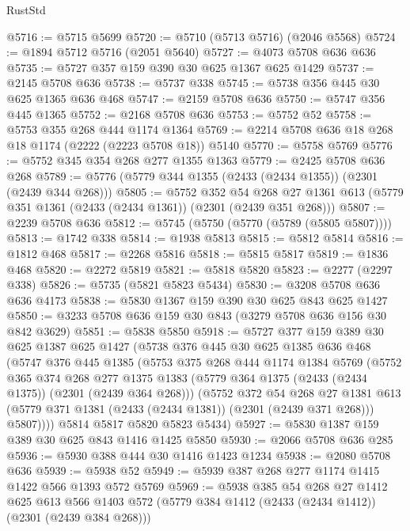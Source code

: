 \begin{lexlean}{RustStd}
\begin{coremodule}
@5716 := @5715 @5699
@5720 := @5710 (@5713 @5716) (@2046 @5568)
@5724 := @1894 @5712 @5716 (@2051 @5640)
@5727 := @4073 @5708 @636 @636
@5735 := @5727 @357 @159 @390 @30 @625 @1367 @625 @1429
@5737 := @2145 @5708 @636
@5738 := @5737 @338
@5745 := @5738 @356 @445 @30 @625 @1365 @636 @468
@5747 := @2159 @5708 @636
@5750 := @5747 @356 @445 @1365
@5752 := @2168 @5708 @636
@5753 := @5752 @52
@5758 := @5753 @355 @268 @444 @1174 @1364
@5769 := @2214 @5708 @636 @18 @268 @18 @1174 (@2222 (@2223 @5708 @18)) @5140
@5770 := @5758 @5769
@5776 := @5752 @345 @354 @268 @277 @1355 @1363
@5779 := @2425 @5708 @636 @268
@5789 := @5776 (@5779 @344 @1355 (@2433 (@2434 @1355)) (@2301 (@2439 @344 @268)))
@5805 := @5752
    @352
    @54
    @268
    @27
    @1361
    @613
    (@5779 @351 @1361 (@2433 (@2434 @1361)) (@2301 (@2439 @351 @268)))
@5807 := @2239 @5708 @636
@5812 := @5745 (@5750 (@5770 (@5789 (@5805 @5807))))
@5813 := @1742 @338
@5814 := @1938 @5813
@5815 := @5812 @5814
@5816 := @1812 @468
@5817 := @2268 @5816
@5818 := @5815 @5817
@5819 := @1836 @468
@5820 := @2272 @5819
@5821 := @5818 @5820
@5823 := @2277 (@2297 @338)
@5826 := @5735 (@5821 @5823 @5434)
@5830 := @3208 @5708 @636 @636 @4173
@5838 := @5830 @1367 @159 @390 @30 @625 @843 @625 @1427
@5850 := @3233 @5708 @636 @159 @30 @843 (@3279 @5708 @636 @156 @30 @842 @3629)
@5851 := @5838 @5850
@5918 := @5727
    @377
    @159
    @389
    @30
    @625
    @1387
    @625
    @1427
    (@5738
      @376
      @445
      @30
      @625
      @1385
      @636
      @468
      (@5747
        @376
        @445
        @1385
        (@5753
          @375
          @268
          @444
          @1174
          @1384
          @5769
          (@5752
            @365
            @374
            @268
            @277
            @1375
            @1383
            (@5779 @364 @1375 (@2433 (@2434 @1375)) (@2301 (@2439 @364 @268)))
            (@5752
              @372
              @54
              @268
              @27
              @1381
              @613
              (@5779 @371 @1381 (@2433 (@2434 @1381)) (@2301 (@2439 @371 @268)))
              @5807))))
      @5814
      @5817
      @5820
      @5823
      @5434)
@5927 := @5830 @1387 @159 @389 @30 @625 @843 @1416 @1425 @5850
@5930 := @2066 @5708 @636 @285
@5936 := @5930 @388 @444 @30 @1416 @1423 @1234
@5938 := @2080 @5708 @636
@5939 := @5938 @52
@5949 := @5939 @387 @268 @277 @1174 @1415 @1422 @566 @1393 @572 @5769
@5969 := @5938
    @385
    @54
    @268
    @27
    @1412
    @625
    @613
    @566
    @1403
    @572
    (@5779 @384 @1412 (@2433 (@2434 @1412)) (@2301 (@2439 @384 @268)))

\end{coremodule}
\end{lexlean}
